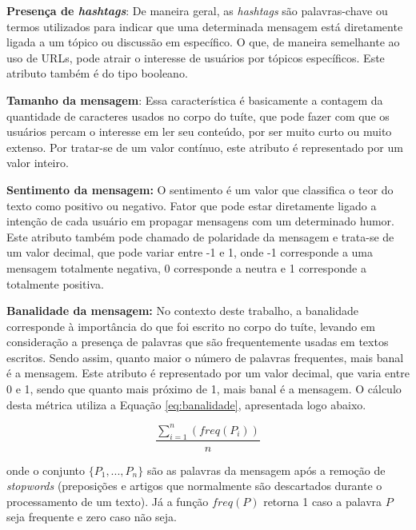 \documentclass[oneside,openright,12pt]{ufsm_2015} %
\begin{document}
    \par \textbf{Presença de \textit{hashtags}}: De maneira geral, as \textit{hashtags} são palavras-chave ou termos utilizados para indicar que uma determinada mensagem está diretamente ligada a um tópico ou discussão em específico. O que, de maneira semelhante ao uso de URLs, pode atrair o interesse de usuários por tópicos específicos. Este atributo também é do tipo booleano.

    \par \textbf{Tamanho da mensagem}: Essa característica é basicamente a contagem da quantidade de caracteres usados no corpo do tuíte, que pode fazer com que os usuários percam o interesse em ler seu conteúdo, por ser muito curto ou muito extenso. Por tratar-se de um valor contínuo, este atributo é representado por um valor inteiro.

    \par \textbf{Sentimento da mensagem:} O sentimento é um valor que classifica o teor do texto como positivo ou negativo. Fator que pode estar diretamente ligado a intenção de cada usuário em propagar mensagens com um determinado humor. Este atributo também pode chamado de polaridade da mensagem e trata-se de um valor decimal, que pode variar entre -1 e 1, onde -1 corresponde a uma mensagem totalmente negativa, 0 corresponde a neutra e 1 corresponde a totalmente positiva.

    \par \textbf{Banalidade da mensagem:} No contexto deste trabalho, a banalidade corresponde à importância do que foi escrito no corpo do tuíte, levando em consideração a presença de palavras que são frequentemente usadas em textos escritos. Sendo assim, quanto maior o número de palavras frequentes, mais banal é a mensagem. Este atributo é representado por um valor decimal, que varia entre 0 e 1, sendo que quanto mais próximo de 1, mais banal é a mensagem. O cálculo desta métrica utiliza a Equação \ref{eq:banalidade}, apresentada logo abaixo.

    \begin{equation} \label{eq:banalidade}
    \frac{\sum_{i=1}^n (freq(P_i))}{n}
    \end{equation}
    
    \par onde o conjunto $\{P_1, ..., P_n\}$ são as palavras da mensagem após a remoção de \textit{stopwords} (preposições e artigos que normalmente são descartados durante o processamento de um texto). Já a função $freq(P)$ retorna 1 caso a palavra $P$ seja frequente e zero caso não seja.
\end{document}
